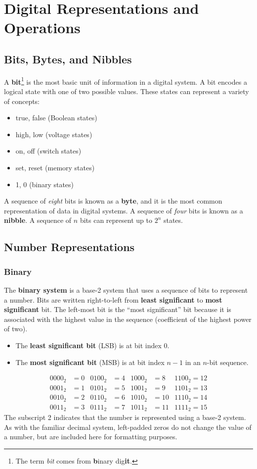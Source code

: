 \documentclass{article}
\begin{document}
\section{Digital Representations and Operations}
\subsection{Bits, Bytes, and Nibbles}
A \textbf{bit}\footnote{The term \textit{bit} comes from
\textbf{b}inary dig\textbf{it}.} is the most basic unit of information
in a digital system. A bit encodes a logical state with one of two
possible values. These states can represent a variety of concepts:
\begin{itemize}
    \item true, false (Boolean states)
    \item high, low (voltage states)
    \item on, off (switch states)
    \item set, reset (memory states)
    \item 1, 0 (binary states)
\end{itemize}
A sequence of \textit{eight} bits is known as a \textbf{byte}, and it is the most
common representation of data in digital systems.
A sequence of \textit{four} bits is known as a \textbf{nibble}.
A sequence of \(n\) bits can represent up to \(2^n\) states.
\subsection{Number Representations}
\subsubsection{Binary}
The \textbf{binary system} is a base-2 system that uses a sequence of
bits to represent a number. Bits are written right-to-left from
\textbf{least significant} to \textbf{most significant} bit. The
left-most bit is the ``most significant'' bit because it is associated
with the highest value in the sequence (coefficient of the highest
power of two).
\begin{itemize}
    \item The \textbf{least significant bit} (LSB) is at bit index 0.
    \item The \textbf{most significant bit} (MSB) is at bit index \(n -
          1\) in an \(n\)-bit sequence.
\end{itemize}
\begin{align*}
    0000_2 & = 0 & 0100_2 & = 4 & 1000_2 & = 8  & 1100_2 = 12 \\
    0001_2 & = 1 & 0101_2 & = 5 & 1001_2 & = 9  & 1101_2 = 13 \\
    0010_2 & = 2 & 0110_2 & = 6 & 1010_2 & = 10 & 1110_2 = 14 \\
    0011_2 & = 3 & 0111_2 & = 7 & 1011_2 & = 11 & 1111_2 = 15
\end{align*}
The subscript 2 indicates that the number is represented using a base-2
system. As with the familiar decimal system, left-padded zeros do not
change the value of a number, but are included here for formatting
purposes.
\end{document}
